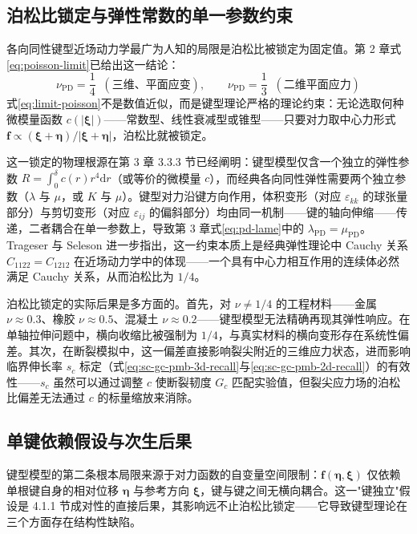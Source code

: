 \subsection{泊松比锁定与弹性常数的单一参数约束}

各向同性键型近场动力学最广为人知的局限是泊松比被锁定为固定值。第 2 章式\eqref{eq:poisson-limit}已给出这一结论：
\begin{equation}
\nu_{\mathrm{PD}} = \frac{1}{4}\;\;(\text{三维、平面应变}),\qquad
\nu_{\mathrm{PD}} = \frac{1}{3}\;\;(\text{二维平面应力})
\label{eq:limit-poisson}
\end{equation}
式\eqref{eq:limit-poisson}不是数值近似，而是键型理论严格的理论约束：无论选取何种微模量函数 $c(|\boldsymbol{\xi}|)$——常数型、线性衰减型或锥型——只要对力取中心力形式 $\mathbf{f}\propto(\boldsymbol{\xi}+\boldsymbol{\eta})/|\boldsymbol{\xi}+\boldsymbol{\eta}|$，泊松比就被锁定。

这一锁定的物理根源在第 3 章 3.3.3 节已经阐明：键型模型仅含一个独立的弹性参数 $R=\int_{0}^{\delta}c(r)r^{4}\mathrm{d}r$（或等价的微模量 $c$），而经典各向同性弹性需要两个独立参数（$\lambda$ 与 $\mu$，或 $K$ 与 $\mu$）。键型对力沿键方向作用，体积变形（对应 $\varepsilon_{kk}$ 的球张量部分）与剪切变形（对应 $\varepsilon_{ij}$ 的偏斜部分）均由同一机制——键的轴向伸缩——传递，二者耦合在单一参数上，导致第 3 章式\eqref{eq:pd-lame}中的 $\lambda_{\mathrm{PD}}=\mu_{\mathrm{PD}}$。Trageser 与 Seleson \cite{TrageserSeleson2020} 进一步指出，这一约束本质上是经典弹性理论中 Cauchy 关系 $C_{1122}=C_{1212}$ 在近场动力学中的体现——一个具有中心力相互作用的连续体必然满足 Cauchy 关系，从而泊松比为 $1/4$。

泊松比锁定的实际后果是多方面的。首先，对 $\nu\neq 1/4$ 的工程材料——金属 $\nu\approx 0.3$、橡胶 $\nu\approx 0.5$、混凝土 $\nu\approx 0.2$——键型模型无法精确再现其弹性响应。在单轴拉伸问题中，横向收缩比被强制为 $1/4$，与真实材料的横向变形存在系统性偏差。其次，在断裂模拟中，这一偏差直接影响裂尖附近的三维应力状态，进而影响临界伸长率 $s_c$ 标定（式\eqref{eq:sc-gc-pmb-3d-recall}与\eqref{eq:sc-gc-pmb-2d-recall}）的有效性——$s_c$ 虽然可以通过调整 $c$ 使断裂韧度 $G_c$ 匹配实验值，但裂尖应力场的泊松比偏差无法通过 $c$ 的标量缩放来消除。

\subsection{单键依赖假设与次生后果}

键型模型的第二条根本局限来源于对力函数的自变量空间限制：$\mathbf{f}(\boldsymbol{\eta},\boldsymbol{\xi})$ 仅依赖单根键自身的相对位移 $\boldsymbol{\eta}$ 与参考方向 $\boldsymbol{\xi}$，键与键之间无横向耦合。这一"键独立"假设是 4.1.1 节成对性的直接后果，其影响远不止泊松比锁定——它导致键型理论在三个方面存在结构性缺陷。

